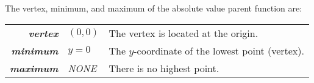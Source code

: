 \begin{myConcept}{The vertex, minimum, and maximum of the absolute value parent function are:}
    \begin{center}
        \Large
        \begin{tabular}{rll}
            {\bfseries\itshape vertex} & $(0,0)$ & The vertex is located at the origin. \\
            {\bfseries\itshape minimum} & $y=0$  & The $y$-coordinate of the lowest point (vertex). \\
            {\bfseries\itshape maximum} & \emph{NONE} & There is no highest point.
        \end{tabular}
    \end{center}
\end{myConcept}

